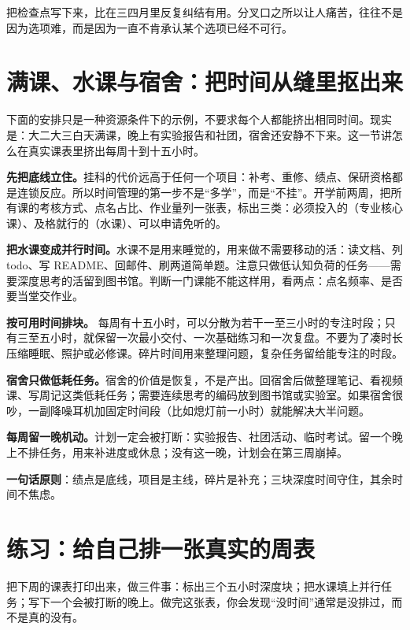 \documentclass[UTF8,zihao=5,openany]{ctexbook}
\begin{document}
把检查点写下来，比在三四月里反复纠结有用。分叉口之所以让人痛苦，往往不是因为选项难，而是因为一直不肯承认某个选项已经不可行。

\section{满课、水课与宿舍：把时间从缝里抠出来}

下面的安排只是一种资源条件下的示例，不要求每个人都能挤出相同时间。现实是：大二大三白天满课，晚上有实验报告和社团，宿舍还安静不下来。这一节讲怎么在真实课表里挤出每周十到十五小时。

\textbf{先把底线立住。}挂科的代价远高于任何一个项目：补考、重修、绩点、保研资格都是连锁反应。所以时间管理的第一步不是“多学”，而是“不挂”。开学前两周，把所有课的考核方式、点名占比、作业量列一张表，标出三类：必须投入的（专业核心课）、及格就行的（水课）、可以申请免听的。

\textbf{把水课变成并行时间。}水课不是用来睡觉的，用来做不需要移动的活：读文档、列 todo、写 README、回邮件、刷两道简单题。注意只做低认知负荷的任务——需要深度思考的活留到图书馆。判断一门课能不能这样用，看两点：点名频率、是否要当堂交作业。

\textbf{按可用时间排块。} 每周有十五小时，可以分散为若干一至三小时的专注时段；只有三至五小时，就保留一次最小交付、一次基础练习和一次复盘。不要为了凑时长压缩睡眠、照护或必修课。碎片时间用来整理问题，复杂任务留给能专注的时段。

\textbf{宿舍只做低耗任务。}宿舍的价值是恢复，不是产出。回宿舍后做整理笔记、看视频课、写周记这类低耗任务；需要连续思考的编码放到图书馆或实验室。如果宿舍很吵，一副降噪耳机加固定时间段（比如熄灯前一小时）就能解决大半问题。

\textbf{每周留一晚机动。}计划一定会被打断：实验报告、社团活动、临时考试。留一个晚上不排任务，用来补进度或休息；没有这一晚，计划会在第三周崩掉。

\begin{keybox}
\textbf{一句话原则}：绩点是底线，项目是主线，碎片是补充；三块深度时间守住，其余时间不焦虑。
\end{keybox}

\section{练习：给自己排一张真实的周表}

把下周的课表打印出来，做三件事：标出三个五小时深度块；把水课填上并行任务；写下一个会被打断的晚上。做完这张表，你会发现“没时间”通常是没排过，而不是真的没有。
\end{document}
